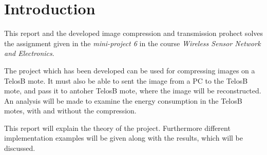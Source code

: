 \chapter{Introduction}
\label{chp:intro}

This report and the developed image compression and transmission prohect solves the assignment given in the \emph{mini-project 6} in the course \emph{Wireless Sensor Network and Electronics}.

The project which has been developed can be used for compressing images on a TelosB mote. It must also be able to sent the image from a PC to the TelosB mote, and pass it to antoher TelosB mote, where the image will be reconstructed. An analysis will be made to examine the energy consumption in the TelosB motes, with and without the compression.

This report will explain the theory of the project. Furthermore different implementation examples will be given along with the results, which will be discussed.